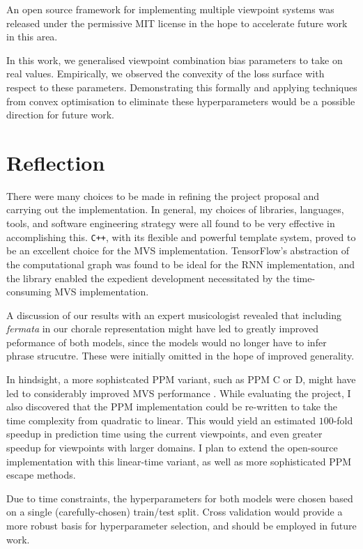\documentclass[12pt,a4paper,twoside,openright]{report}
\begin{document}
An open source framework for implementing multiple viewpoint systems was
released under the permissive MIT license in the hope to accelerate future work
in this area. 

In this work, we generalised viewpoint combination bias parameters to take on
real values. Empirically, we observed the convexity of the loss surface with
respect to these parameters. Demonstrating this formally and applying techniques
from convex optimisation to eliminate these hyperparameters would be a
possible direction for future work.

\section{Reflection}

There were many choices to be made in refining the project proposal and carrying
out the implementation. In general, my choices of libraries, languages, tools,
and software engineering strategy were all found to be very effective in
accomplishing this. \texttt{C++}, with its flexible and powerful template
system, proved to be an excellent choice for the MVS implementation.
TensorFlow's abstraction of the computational graph was found to be ideal for
the RNN implementation, and the library enabled the expedient development
necessitated by the time-consuming MVS implementation.

A discussion of our results with an expert musicologist revealed that including
\emph{fermata} in our chorale representation might have led to greatly
improved peformance of both models, since the models would no longer have to
infer phrase strucutre. These were initially omitted in the hope of improved
generality.

In hindsight, a more sophistcated PPM variant, such as PPM C or D, might have
led to considerably improved MVS performance \cite{pearce2004combining}. While
evaluating the project, I also discovered that the PPM implementation could be
re-written to take the time complexity from quadratic to linear.  This would
yield an estimated $100$-fold speedup in prediction time using the current
viewpoints, and even greater speedup for viewpoints with larger domains. I plan
to extend the open-source implementation with this linear-time variant, as well
as more sophisticated PPM escape methods.

Due to time constraints, the hyperparameters for both models were chosen based
on a single (carefully-chosen) train/test split.  Cross validation would provide
a more robust basis for hyperparameter selection, and should be employed in
future work.
\end{document}
